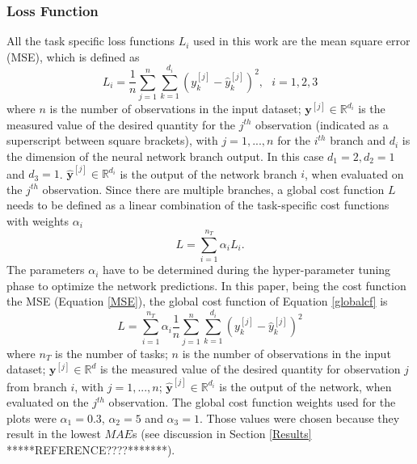 \documentclass[9pt,twocolumn,twoside,pdftex]{optica}
\begin{document}
\subsubsection{Loss Function}

All the task specific loss functions $L_i$ used in this work are the mean square error (MSE), which is defined as
\begin{equation}
L_i = \frac{1}{n} \sum_{j=1}^n \sum_{k=1}^{d_i} (y_k^{[j]}-\hat y_k^{[j]})^2, \ \ \ i=1,2,3
\label{MSE}
\end{equation}
where $n$ is the number of observations in the input dataset; ${\mathbold y}^{[j]} \in \mathbb{R}^{d_i}$ is the measured value of the desired quantity for the $j^{th}$ observation (indicated as a superscript between square brackets), with $j=1, ..., n$ for the $i^{th}$ branch and $d_i$ is the dimension of the neural network branch output. In this case $d_1=2, d_2=1$ and $d_3=1$. $ \hat {\mathbold y}^{[j]} \in \mathbb{R}^{d_i}$ is the output of the network branch $i$, when evaluated on the $j^{th}$ observation. Since there are multiple branches, a global cost function $L$ needs to be defined as a linear combination of the task-specific cost functions with weights $\alpha_i$ 
\begin{equation}
L = \sum_{i=1}^{n_T}\alpha_i L_i .
\label{globalcf}
\end{equation}
The parameters $\alpha_i$ have to be determined during the hyper-parameter tuning phase to optimize the network predictions.
In this paper, being the cost function the MSE (Equation \ref{MSE}), the global cost function of Equation \ref{globalcf} is
\begin{equation}
L = \sum_{i=1}^{n_T}\alpha_i \frac{1}{n} \sum_{j=1}^n \sum_{k=1}^{d_i} (y_k^{[j]}-\hat y_k^{[j]})^2
\end{equation}
where  $n_T$ is the number of tasks; $n$ is the number of observations in the input dataset; ${\mathbold y}^{[j]} \in \mathbb{R}^d$ is the measured value of the desired quantity for observation $j$ from branch $i$, with $j=1, ..., n$; $ \hat {\mathbold y}^{[j]} \in \mathbb{R}^{d_i}$ is the output of the network, when evaluated on the $j^{th}$ observation.
The global cost function weights used for the plots were $\alpha_1 = 0.3$, $\alpha_2 = 5$ and $\alpha_3 = 1$. Those values were chosen because they result in the lowest $MAE$s (see discussion in Section \ref{Results} *****REFERENCE????*******).
 
\end{document}
